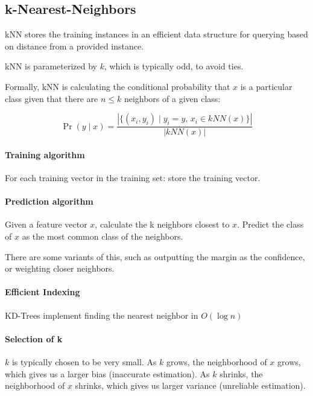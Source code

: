 \documentclass{idc_msc}
\begin{document}
\subsection{k-Nearest-Neighbors}

kNN stores the training instances in an efficient data structure for querying based on distance from a provided instance.

kNN is parameterized by \(k\), which is typically odd, to avoid ties.

Formally, kNN is calculating the conditional probability that \(x\) is a particular class given that there are \(n \le k\) neighbors of a given class:

\[\Pr(y \mid x) = \frac{|\{(x_i,y_i)\mid y_i = y,\, x_i \in kNN(x)\}|}{|kNN(x)|}\]

\paragraph{Training algorithm}

For each training vector in the training set: store the training vector.

\paragraph{Prediction algorithm}

Given a feature vector \(x\), calculate the k neighbors closest to \(x\). Predict the class of \(x\) as the most common class of the neighbors.

There are some variants of this, such as outputting the margin as the confidence, or weighting closer neighbors.

\paragraph{Efficient Indexing}

KD-Trees implement finding the nearest neighbor in \(O(\log n)\)

\paragraph{Selection of k}

\(k\) is typically chosen to be very small.
As \(k\) grows, the neighborhood of \(x\) grows, which gives us a larger bias (inaccurate estimation).
As \(k\) shrinks, the neighborhood of \(x\) shrinks, which gives us larger variance (unreliable estimation).
\end{document}
